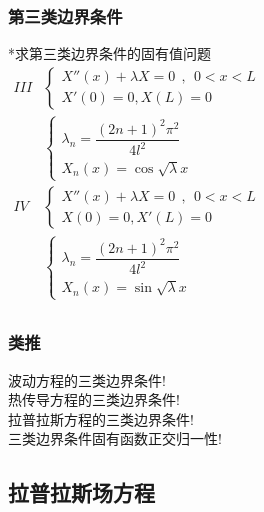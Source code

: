 \begin{frame}
	\frametitle{第三类边界条件}
	*求第三类边界条件的固有值问题\\
	$\begin{array}{lllllllll}
	III & \begin{cases}
			X'' (x)  + \lambda X =0   ~~,~~ 0<x<L\\
			X' (0) =0, X (L) =0
	\end{cases}\\	
	& \begin{cases}
		\lambda_n=\dfrac{(2n+1)^2 \pi ^2}{4l^2}\\
		X_n(x) = \cos \sqrt{\lambda} x
	\end{cases}\\	
	IV&\begin{cases}
		X'' (x)  + \lambda X =0   ~~,~~ 0<x<L\\
		X (0) =0, X' (L) =0
	\end{cases} \\	
	& \begin{cases}
		\lambda_n=\dfrac{(2n+1)^2 \pi ^2}{4l^2}\\
		X_n(x) = \sin \sqrt{\lambda} x
    \end{cases}\\	
	\end{array}$ \\ 
\end{frame}

\begin{frame}
    \frametitle{类推}
    {\color{red}{[X]}} 波动方程的三类边界条件!\\
    {\color{red}{[X]}} 热传导方程的三类边界条件!\\
    {\color{red}{[X]}} 拉普拉斯方程的三类边界条件!\\
    {\color{red}{[X]}} 三类边界条件固有函数正交归一性!\\
\end{frame}	

\subsection{拉普拉斯场方程}

